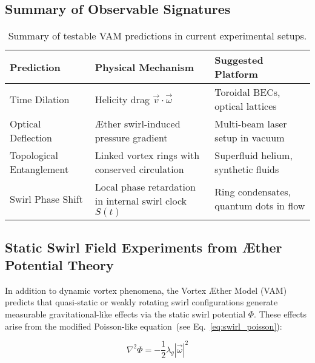\documentclass[12pt]{article}
\begin{document}
            \subsection*{Summary of Observable Signatures}
        
            \begin{table}[H]
                \centering
                \footnotesize
                \begin{tabular}{|p{3.5cm}|p{4.8cm}|p{5.0cm}|}
                    \hline
                    \textbf{Prediction} & \textbf{Physical Mechanism} & \textbf{Suggested Platform} \\
                    \hline
                    Time Dilation & Helicity drag \( \vec{v} \cdot \vec{\omega} \) & Toroidal BECs, optical lattices \\
                    \hline
                    Optical Deflection & Æther swirl-induced pressure gradient & Multi-beam laser setup in vacuum \\
                    \hline
                    Topological Entanglement & Linked vortex rings with conserved circulation & Superfluid helium, synthetic fluids \\
                    \hline
                    Swirl Phase Shift & Local phase retardation in internal swirl clock \( S(t) \) & Ring condensates, quantum dots in flow \\
                    \hline
                \end{tabular}
                \caption{Summary of testable VAM predictions in current experimental setups.}
            \end{table}
        
            \subsection{Static Swirl Field Experiments from Æther Potential Theory}
        
            In addition to dynamic vortex phenomena, the Vortex \AE{}ther Model (VAM) predicts that quasi-static or weakly rotating swirl configurations generate measurable gravitational-like effects via the static swirl potential \( \Phi \). These effects arise from the modified Poisson-like equation~(see Eq.~\ref{eq:swirl_poisson}):
        
            \begin{equation}
                \nabla^2 \Phi = -\frac{1}{2} \lambda_g |\vec{\omega}|^2
            \end{equation}
        
\end{document}
